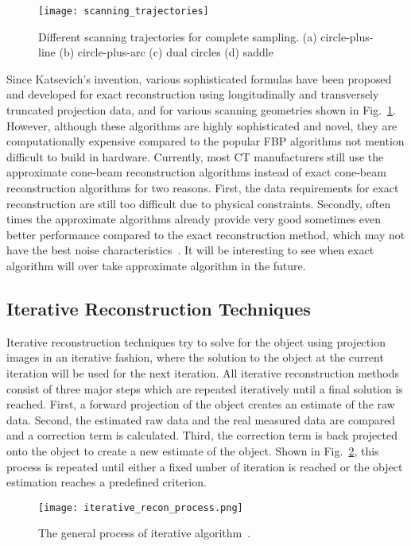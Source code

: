 \begin{figure}[h]
\texttt{[image: scanning\_trajectories]}
\caption{Different scanning trajectories for complete sampling. (a) circle-plus-line (b) circle-plus-arc (c) dual circles (d) saddle}
\label{fig:scanning_trajectories}
\end{figure}

Since Katsevich's invention, various sophisticated formulas have been proposed and developed for exact reconstruction using longitudinally and transversely truncated projection data, and for various scanning geometries shown in Fig.~\ref{fig:scanning_trajectories}.  However, although these algorithms are highly sophisticated and novel, they are computationally expensive compared to the popular FBP algorithms not mention difficult to build in hardware.  Currently, most CT manufacturers still use the approximate cone-beam reconstruction algorithms instead of exact cone-beam reconstruction algorithms for two reasons.  First, the data requirements for exact reconstruction are still too difficult due to physical constraints.  Secondly, often times the approximate algorithms already provide very good sometimes even better performance compared to the exact reconstruction method, which may not have the best noise characteristics~\citep{Wang2008}.  It will be interesting to see when exact algorithm will over take approximate algorithm in the future.

\subsection{Iterative Reconstruction Techniques}
Iterative reconstruction techniques try to solve for the object using projection images in an iterative fashion, where the solution to the object at the current iteration will be used for the next iteration.  All iterative reconstruction methods consist of three major steps which are repeated iteratively until a final solution is reached.  First, a forward projection of the object creates an estimate of the raw data.  Second, the estimated raw data and the real measured data are compared and a correction term is calculated.  Third, the correction term is back projected onto the object to create a new estimate of the object.  Shown in Fig.~\ref{fig:generalIR}, this process is repeated until either a fixed umber of iteration is reached or the object estimation reaches a predefined criterion.

\begin{figure}
\centering
\texttt{[image: iterative\_recon\_process.png]}
\caption{The general process of iterative algorithm~\citep{Beister2012}.}
\label{fig:generalIR}
\end{figure}

